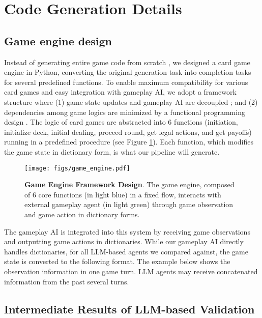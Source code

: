 

\section{Code Generation Details}


\subsection{Game engine design}
\label{sup:game-engine}

Instead of generating entire game code from scratch \cite{chatdev}, we designed a card game engine in Python, converting the original generation task into completion tasks for several predefined functions.
To enable maximum compatibility for various card games and easy integration with gameplay AI, we adopt a framework structure where (1) game state updates and gameplay AI are decoupled \cite{zha_douzero_2021}; and (2) dependencies among game logics are minimized by a functional programming design \cite{wu2024instructiondriven}.
The logic of card games are abstracted into 6 functions (initiation, initialize deck, initial dealing, proceed round, get legal actions, and get payoffs) running in a predefined procedure (see Figure \ref{fig:game-engine}). Each function, which modifies the game state in dictionary form, is what our pipeline will generate.

\begin{figure}[ht]
  \centering
  \texttt{[image: figs/game\_engine.pdf]}
  \caption{\textbf{Game Engine Framework Design}. The game engine, composed of 6 core functions (in light blue) in a fixed flow, interacts with external gameplay agent (in light green) through game observation and game action in dictionary forms.}\label{fig:game-engine}
\end{figure}


The gameplay AI is integrated into this system by receiving game observations and outputting game actions in dictionaries. While our gameplay AI directly handles dictionaries, for all LLM-based agents we compared against, the game state is converted to the following format. The example below shows the observation information in one game turn. LLM agents may receive concatenated information from the past several turns.


\subsection{Intermediate Results of LLM-based Validation}

